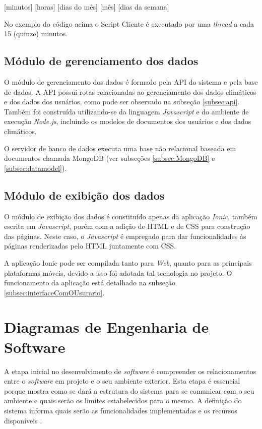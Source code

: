 \centerline{[minutos] [horas] [dias do mês] [mês] [dias da semana]}


No exemplo do código acima o Script Cliente é executado por uma \textit{thread} a cada 15 (quinze) minutos.

\subsection{Módulo de gerenciamento dos dados}

O módulo de gerenciamento dos dados é formado pela API do sistema e pela base de dados. A API possui rotas relacionadas ao gerenciamento dos dados climáticos e dos dados dos usuários, como pode ser observado na subseção \ref{subsec:api}. Também foi construída utilizando-se da linguagem \textit{Javascript} e do ambiente de execução \textit{Node.js}, incluindo os modelos de documentos dos usuários e dos dados climáticos.
 
O servidor de banco de dados executa uma base não relacional baseada em documentos chamada MongoDB (ver subseções \ref{subsec:MongoDB} e \ref{subsec:datamodel}).

 \subsection{Módulo de exibição dos dados}

O módulo de exibição dos dados é constituído apenas da aplicação \textit{Ionic}, também escrita em \textit{Javascript}, porém com a adição de HTML e de CSS para construção das páginas. Neste caso, o \textit{Javascript} é empregado para dar funcionalidades às páginas renderizadas pelo HTML juntamente com CSS.

A aplicação Ionic pode ser compilada tanto para \textit{Web}, quanto para as principais plataformas móveis, devido a isso foi adotada tal tecnologia no projeto. O funcionamento da aplicação está detalhado na subseção \ref{subsec:interfaceComOUsurario}.


\section{Diagramas de Engenharia de Software} \label{sec:diagramas}
A etapa inicial no desenvolvimento de \textit{software} é compreender os relacionamentos entre o \textit{software} em projeto e o seu ambiente exterior. Esta etapa é essencial porque mostra como se dará a estrutura do sistema para se comunicar com o seu ambiente e quais serão os limites estabelecidos para o mesmo. A definição do sistema informa quais serão as funcionalidades implementadas e os recursos disponíveis \cite{sommerville2011engenharia}.

